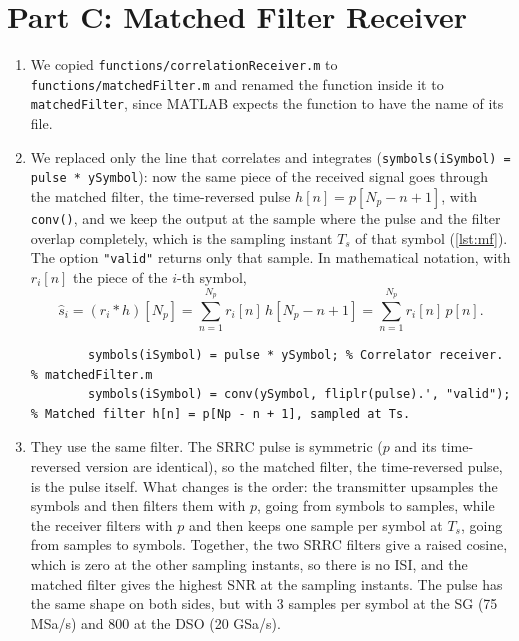 \documentclass[11pt]{article}
\begin{document}
\section*{Part C: Matched Filter Receiver}
\begin{enumerate}[resume]
    \item We copied \texttt{functions/correlationReceiver.m} to \texttt{functions/matchedFilter.m} and renamed the function inside it to \texttt{matchedFilter}, since MATLAB expects the function to have the name of its file.

    \item We replaced only the line that correlates and integrates (\texttt{symbols(iSymbol) = pulse * ySymbol}): now the same piece of the received signal goes through the matched filter, the time-reversed pulse $h[n] = p[N_p - n + 1]$, with \texttt{conv()}, and we keep the output at the sample where the pulse and the filter overlap completely, which is the sampling instant $T_s$ of that symbol (\cref{lst:mf}). The option \texttt{"valid"} returns only that sample. In mathematical notation, with $r_i[n]$ the piece of the $i$-th symbol,
    \begin{equation}
        \hat{s}_i = (r_i * h)[N_p] = \sum_{n=1}^{N_p} r_i[n]\, h[N_p - n + 1] = \sum_{n=1}^{N_p} r_i[n]\, p[n].
    \end{equation}
\begin{lstlisting}[caption={Our change to \texttt{matchedFilter.m}, the only line that differs from \texttt{correlationReceiver.m} apart from the function name.}, label={lst:mf}]
% correlationReceiver.m
        symbols(iSymbol) = pulse * ySymbol; % Correlator receiver.
% matchedFilter.m
        symbols(iSymbol) = conv(ySymbol, fliplr(pulse).', "valid"); % Matched filter h[n] = p[Np - n + 1], sampled at Ts.
\end{lstlisting}

    \item They use the same filter. The SRRC pulse is symmetric ($p$ and its time-reversed version are identical), so the matched filter, the time-reversed pulse, is the pulse itself. What changes is the order: the transmitter upsamples the symbols and then filters them with $p$, going from symbols to samples, while the receiver filters with $p$ and then keeps one sample per symbol at $T_s$, going from samples to symbols. Together, the two SRRC filters give a raised cosine, which is zero at the other sampling instants, so there is no ISI, and the matched filter gives the highest SNR at the sampling instants. The pulse has the same shape on both sides, but with 3 samples per symbol at the SG (75 MSa/s) and 800 at the DSO (20 GSa/s).


\end{enumerate}
\end{document}
